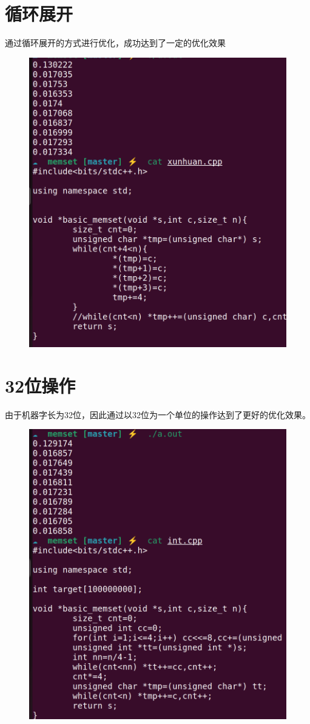 \documentclass{article}
\begin{document}
	\section{循环展开}
	通过循环展开的方式进行优化，成功达到了一定的优化效果
	\begin{figure}[h]
		\centering
		\includegraphics[width=12cm]{./2.png}
	\end{figure}
	\newpage
	\section{32位操作}
	由于机器字长为32位，因此通过以32位为一个单位的操作达到了更好的优化效果。

	\begin{figure}[h]
		\centering
		\includegraphics[width=12cm]{./3.png}
	\end{figure}
	
	
\end{document}
